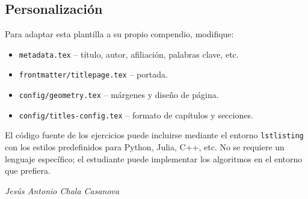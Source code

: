\subsection*{Personalización}
Para adaptar esta plantilla a su propio compendio, modifique:
\begin{itemize}
  \item \texttt{metadata.tex} – título, autor, afiliación, palabras clave, etc.
  \item \texttt{frontmatter/titlepage.tex} – portada.
  \item \texttt{config/geometry.tex} – márgenes y diseño de página.
  \item \texttt{config/titles-config.tex} – formato de capítulos y secciones.
\end{itemize}

El código fuente de los ejercicios puede incluirse mediante el entorno \texttt{lstlisting} con los estilos predefinidos para Python, Julia, C++, etc. No se requiere un lenguaje específico; el estudiante puede implementar los algoritmos en el entorno que prefiera.

\vspace{1.2cm}
\begin{flushright}
\textit{Jesús Antonio Chala Casanova}\\[2pt]
\the\year
\end{flushright}